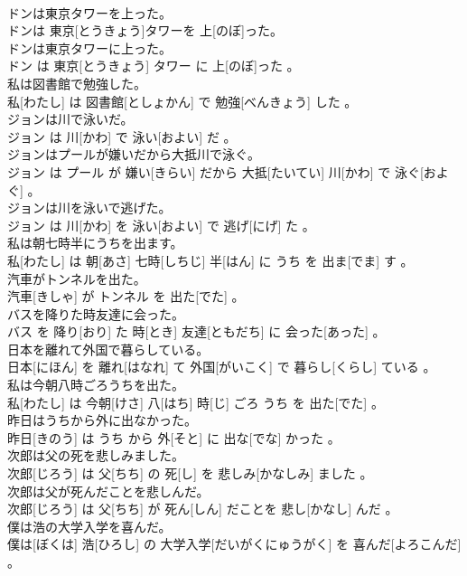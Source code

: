 \documentclass[8pt]{extreport}
\begin{document}
\begin{CJK}{UTF8}{min}
\\	ドンは東京タワーを上った。	
\\	ドンは 東京[とうきょう]タワーを 上[のぼ]った。
\\	ドンは東京タワーに上った。	
\\	ドン は 東京[とうきょう] タワー に 上[のぼ]った 。
\\	私は図書館で勉強した。	
\\	私[わたし] は 図書館[としょかん] で 勉強[べんきょう] した 。
\\	ジョンは川で泳いだ。	
\\	ジョン は 川[かわ] で 泳い[およい] だ 。
\\	ジョンはプールが嫌いだから大抵川で泳ぐ。	
\\	ジョン は プール が 嫌い[きらい] だから 大抵[たいてい] 川[かわ] で 泳ぐ[およぐ] 。
\\	ジョンは川を泳いで逃げた。	
\\	ジョン は 川[かわ] を 泳い[およい] で 逃げ[にげ] た 。
\\	私は朝七時半にうちを出ます。	
\\	私[わたし] は 朝[あさ] 七時[しちじ] 半[はん] に うち を 出ま[でま] す 。
\\	汽車がトンネルを出た。	
\\	汽車[きしゃ] が トンネル を 出た[でた] 。
\\	バスを降りた時友達に会った。	
\\	バス を 降り[おり] た 時[とき] 友達[ともだち] に 会った[あった] 。
\\	日本を離れて外国で暮らしている。	
\\	日本[にほん] を 離れ[はなれ] て 外国[がいこく] で 暮らし[くらし] ている 。
\\	私は今朝八時ごろうちを出た。	
\\	私[わたし] は 今朝[けさ] 八[はち] 時[じ] ごろ うち を 出た[でた] 。
\\	昨日はうちから外に出なかった。	
\\	昨日[きのう] は うち から 外[そと] に 出な[でな] かった 。
\\	次郎は父の死を悲しみました。	
\\	次郎[じろう] は 父[ちち] の 死[し] を 悲しみ[かなしみ] ました 。
\\	次郎は父が死んだことを悲しんだ。	
\\	次郎[じろう] は 父[ちち] が 死ん[しん] だことを 悲し[かなし] んだ 。
\\	僕は浩の大学入学を喜んだ。	
\\	僕は[ぼくは] 浩[ひろし] の 大学入学[だいがくにゅうがく] を 喜んだ[よろこんだ] 。

\end{CJK}
\end{document}

